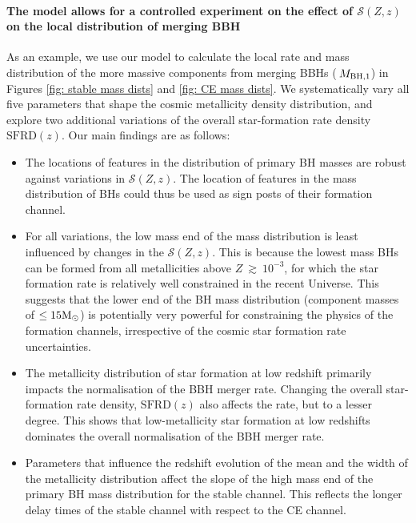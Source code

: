 \documentclass[twocolumn]{aastex631}
\newcommand{\Msun}{\ensuremath{\rm{M}_{\odot}}\xspace}
\newcommand{\Mbheen}{\ensuremath{\,M_{\rm BH, 1}}\xspace}
\newcommand{\SFRDzZ}{\ensuremath{\mathcal{S}(Z,z)}\xspace}
\newcommand{\SFRDz}{\ensuremath{\mathrm{SFRD}(z)}\xspace}
\begin{document}
\paragraph{The model allows for a controlled experiment on the effect of \SFRDzZ on the local distribution of merging BBH}
As an example, we use our model to calculate the local rate and mass distribution of the more massive components from merging BBHs (\Mbheen) in Figures \ref{fig: stable mass dists} and \ref{fig: CE mass dists}.
We systematically vary all five parameters that shape the cosmic metallicity density distribution, and explore two additional variations of the overall star-formation rate density \SFRDz.
Our main findings are as follows:
\begin{itemize}
    
    \item The locations of features in the distribution of primary BH masses are robust against variations in \SFRDzZ. The location of features in the mass distribution of BHs could thus be used as sign posts of their formation channel. 
    
    \item For all variations, the low mass end of the mass distribution is least influenced by changes in the \SFRDzZ.
    This is because the lowest mass BHs can be formed from all metallicities above $Z~\gtrsim~10^{-3}$, for which the star formation rate is relatively well constrained in the recent Universe. 
    This suggests that the lower end of the BH mass distribution (component masses of $\leq 15\Msun$) is potentially very powerful for constraining the physics of the formation channels, irrespective of the cosmic star formation rate uncertainties.
    
    \item The metallicity distribution of star formation at low redshift primarily impacts the normalisation of the BBH merger rate. Changing the overall star-formation rate density, \SFRDz also affects the rate, but to a lesser degree. This shows that low-metallicity star formation at low redshifts dominates the overall normalisation of the BBH merger rate. 
    
    \item Parameters that influence the redshift evolution of the mean and the width of the metallicity distribution affect the slope of the high mass end of the primary BH mass distribution for the stable channel. This reflects the longer delay times of the stable channel with respect to the CE channel. 
    
\end{itemize}
\end{document}
